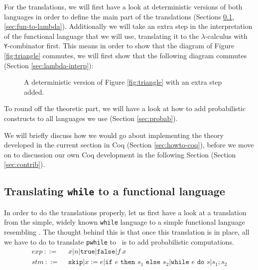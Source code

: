 \documentclass[11pt, leqno, titlepage]{article}
\theoremstyle{definition}
\begin{document}
For the translations, we will first have a look at deterministic versions of both
languages in order to define the main part of the translations (Sections
\ref{sec:while-to-fun}, \ref{sec:fun-to-lambda}). Additionally we will take an extra
step in the interpretation of the functional language that we will use, translating
it to the $\lambda$-calculus with \texttt{Y}-combinator first.  This means in order
to show that the diagram of Figure \ref{fig:triangle} commutes, we will first show
that the following diagram commutes (Section \ref{sec:lambda-interp}):

\begin{figure}[h]
  \centering
  \caption{A deterministic version of Figure \ref{fig:triangle} with an extra step
    added. }
  \label{fig:triangle-det}
\end{figure}
  
To round off the theoretic part, we will have a look at how to add probabilistic
constructs to all languages we use (Section \ref{sec:probab}).

We will briefly discuss how we would go about implementing the theory developed in
the current section in Coq (Section \ref{sec:howto-coq}), before we move on to
discussion our own Coq development in the following Section (Section
\ref{sec:contrib}).


\subsection{Translating \texttt{while} to a functional
  language}\label{sec:while-to-fun} 
% 
In order to do the translations properly, let us first have a look at a translation
from the simple, widely known \texttt{while} language to a simple functional language
resembling \rml. The thought behind this is that once this translation is in place,
all we have to do to translate \texttt{pwhile} to \rml\ is to add probabilistic
computations. 
\begin{align*}
  exp~  ::=~~ & x \vert n \vert \texttt{true} \vert \texttt{false} \vert f~x \\
  stm~  ::=~~ & \texttt{skip} \vert x := e
               \vert \texttt{if } e \texttt{ then } s_1 \texttt{ else } s_2
               \vert \texttt{while } e \texttt{ do } s \vert s_1;s_2
\end{align*}
\end{document}
